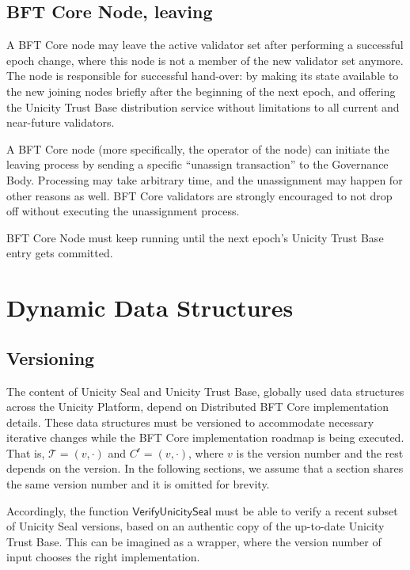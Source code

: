 \subsection{BFT Core Node, leaving}

A BFT Core node may leave the active validator set after performing a successful epoch change, where this node is not a member of the new validator set anymore. The node is responsible for successful hand-over: by making its state available to the new joining nodes briefly after the beginning of the next epoch, and offering the Unicity Trust Base distribution service without limitations to all current and near-future validators.

A BFT Core node (more specifically, the operator of the node) can initiate the leaving process by sending a specific ``unassign transaction'' to the Governance Body. Processing may take arbitrary time, and the unassignment may happen for other reasons as well. BFT Core validators are strongly encouraged to not drop off without executing the unassignment process.

\begin{ruledef*}
  BFT Core Node must keep running until the next epoch's Unicity Trust Base entry gets committed.
\end{ruledef*}


\section{Dynamic Data Structures}

\subsection{Versioning}\label{sec:rp-versions}

The content of Unicity Seal and Unicity Trust Base, globally used data structures across the Unicity Platform, depend on Distributed BFT Core implementation details. These data structures must be versioned to accommodate necessary iterative changes while the BFT Core implementation roadmap is being executed. That is, $\mathcal{T} = (v, \cdot)$ and $C^\mathsf{r} = (v, \cdot)$, where $v$ is the version number and the rest depends on the version. In the following sections, we assume that a section shares the same version number and it is omitted for brevity.

Accordingly, the function $\mathsf{VerifyUnicitySeal}$ must be able to verify a recent subset of Unicity Seal versions, based on an authentic copy of the up-to-date Unicity Trust Base. This can be imagined as a wrapper, where the version number of input chooses the right implementation.

